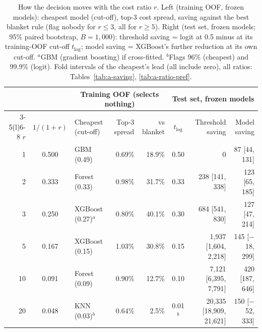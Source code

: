 \begin{table}[t]
\caption{How the decision moves with the cost ratio $r$. Left (training OOF, frozen models): cheapest model (cut-off), top-3 cost spread, saving against the best blanket rule (flag nobody for $r \le 3$, all for $r \ge 5$). Right (test set, frozen models; 95\% paired bootstrap, $B = 1{,}000$): threshold saving = logit at 0.5 minus at its training-OOF cut-off $t_{\mathrm{log}}$; model saving = XGBoost's further reduction at its own cut-off. $^a$GBM (gradient boosting) if cross-fitted. $^b$Flags 96\% (cheapest) and 99.9\% (logit). Fold intervals of the cheapest's lead (all include zero), all ratios: Tables~\ref{tab:a-saving}, \ref{tab:a-ratio-pref}.}
\label{tab:saving}
\centering
\footnotesize
\setlength{\tabcolsep}{2.6pt}
\begin{tabular}{@{}rclrrcrr@{}}
\toprule
 & & \multicolumn{3}{c}{Training OOF (selects nothing)} & \multicolumn{3}{c}{Test set, frozen models} \\
\cmidrule(lr){3-5}\cmidrule(l){6-8}
$r$ & $1/(1+r)$ & Cheapest (cut-off) & Top-3 spread & vs blanket & $t_{\mathrm{log}}$ & Threshold saving & Model saving \\
\midrule
1  & 0.500 & GBM (0.49)            & 0.69\% & 18.9\% & 0.50     & 0                             & 87 [44, 131]     \\
2  & 0.333 & Forest (0.33)         & 0.98\% & 31.7\% & 0.33     & 238 [141, 338]                & 123 [65, 185]    \\
3  & 0.250 & XGBoost (0.27)$^a$    & 0.80\% & 40.1\% & 0.30     & 684 [541, 830]                & 127 [47, 214]    \\
5  & 0.167 & XGBoost (0.15)        & 1.03\% & 30.8\% & 0.15     & 1{,}937 [1{,}604, 2{,}218]    & 145 [$-$18, 299] \\
10 & 0.091 & Forest (0.09)         & 0.90\% & 12.7\% & 0.10     & 7{,}121 [6{,}395, 7{,}791]    & 420 [187, 646]   \\
20 & 0.048 & KNN (0.03)$^b$        & 0.64\% & 2.5\%  & 0.01$^b$ & 20{,}335 [18{,}909, 21{,}621] & 150 [$-$52, 333] \\
\bottomrule
\end{tabular}
\end{table}

